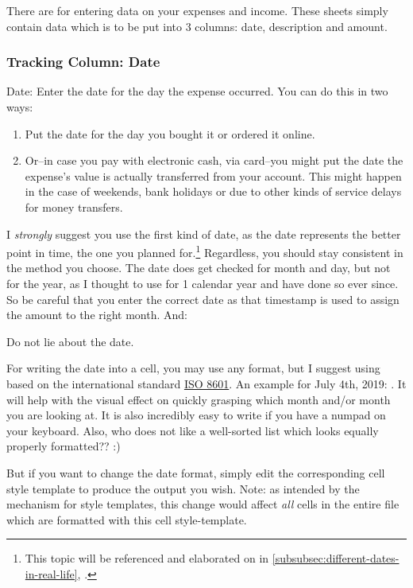 There are  for entering data on your expenses and income.
These sheets simply contain data which is to be put into 3 columns: date, description and amount.

\subsubsection{Tracking Column: Date}
\label{subsec:tracking-column-date}

Date: Enter the date for the day the expense occurred.
You can do this in two ways:
\begin{enumerate}
	\item Put the date for the day you bought it or ordered it online.
	\item Or--in case you pay with electronic cash, \eg via card--you might put the date the expense's value is actually transferred from your account.
	This might happen in the case of weekends, bank holidays or due to other kinds of service delays for money transfers.
\end{enumerate}
I \emph{strongly} suggest you use the first kind of date, as the date represents the better point in time, \ie the one you planned for.\footnote{This topic will be referenced and elaborated on in \autoref{subsubsec:different-dates-in-real-life}, .}
Regardless, you should stay consistent in the method you choose.
The date does get checked for month and day, but not for the year, as I thought to use \tfn for 1 calendar year and have done so ever since.
So be careful that you enter the correct date as that timestamp is used to assign the amount to the right month.
And:
\begin{specialnote}
	Do not lie about the date.
\end{specialnote}

For writing the date into a cell, you may use any format, but I suggest using  based on the international standard \href{https://en.wikipedia.org/wiki/ISO_8601}{ISO 8601}.
An example for July 4th, 2019: .
It will help with the visual effect on quickly grasping which month and/or month you are looking at.
It is also incredibly easy to write if you have a numpad on your keyboard.
Also, who does not like a well-sorted list which looks equally properly formatted?? :)

But if you want to change the date format, simply edit the corresponding cell style template to produce the output you wish.
Note: as intended by the mechanism for style templates, this change would affect \emph{all} cells in the entire file which are formatted with this cell style-template.


